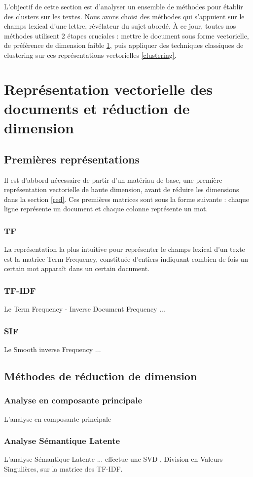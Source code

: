 L'objectif de cette section est d'analyser un ensemble de méthodes pour établir des clusters sur les textes. Nous avons choisi des méthodes qui s’appuient sur le champs lexical d'une lettre, révélateur du sujet abordé. À ce jour, toutes nos méthodes utilisent 2 étapes cruciales : mettre le document sous forme vectorielle, de préférence de dimension faible \ref{vector}, puis appliquer des techniques classiques de clustering sur ces représentations vectorielles \ref{clustering}.
\section{Représentation vectorielle des documents et réduction de dimension}
\label{vector}
\subsection{Premières représentations}
\label{base}
Il est d'abbord nécessaire de partir d'un matériau de base, une première représentation vectorielle de haute dimension, avant de réduire les dimensions dans la section \ref{red}. Ces premières matrices sont sous la forme suivante : chaque ligne représente un document et chaque colonne représente un mot.
\subsubsection{TF}
La représentation la plus intuitive pour représenter le champs lexical d'un texte est la matrice Term-Frequency, constituée d'entiers indiquant combien de fois un certain mot apparaît dans un certain document.
\subsubsection{TF-IDF}
Le Term Frequency - Inverse Document Frequency ...
\subsubsection{SIF}
Le Smooth inverse Frequency ...
\subsection{Méthodes de réduction de dimension}
\subsubsection{Analyse en composante principale}
L'analyse en composante principale 
\subsubsection{Analyse Sémantique Latente}
L'analyse Sémantique Latente ... effectue une SVD , Division en Valeurs Singulières, sur la matrice des TF-IDF.
